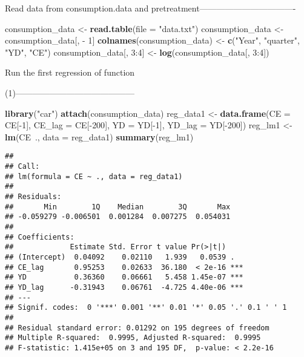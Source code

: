 \documentclass[]{article}
\title{}
\author{}
\date{}
\newenvironment{Shaded}{\begin{snugshade}}{\end{snugshade}}
\newcommand{\KeywordTok}[1]{\textcolor[rgb]{0.13,0.29,0.53}{\textbf{{#1}}}}
\newcommand{\DataTypeTok}[1]{\textcolor[rgb]{0.13,0.29,0.53}{{#1}}}
\newcommand{\DecValTok}[1]{\textcolor[rgb]{0.00,0.00,0.81}{{#1}}}
\newcommand{\StringTok}[1]{\textcolor[rgb]{0.31,0.60,0.02}{{#1}}}
\newcommand{\NormalTok}[1]{{#1}}
\begin{document}
Read data from consumption.data and
pretreatment----------------------------------

\begin{Shaded}
\begin{Highlighting}[]
\NormalTok{consumption_data <-}\StringTok{ }\KeywordTok{read.table}\NormalTok{(}\DataTypeTok{file =} \StringTok{"data.txt"}\NormalTok{)}
\NormalTok{consumption_data <-}\StringTok{ }\NormalTok{consumption_data[, -}\StringTok{ }\DecValTok{1}\NormalTok{]}
\KeywordTok{colnames}\NormalTok{(consumption_data) <-}\StringTok{ }\KeywordTok{c}\NormalTok{(}\StringTok{"Year"}\NormalTok{, }\StringTok{"quarter"}\NormalTok{, }\StringTok{"YD"}\NormalTok{, }\StringTok{"CE"}\NormalTok{)}
\NormalTok{consumption_data[, }\DecValTok{3}\NormalTok{:}\DecValTok{4}\NormalTok{] <-}\StringTok{ }\KeywordTok{log}\NormalTok{(consumption_data[, }\DecValTok{3}\NormalTok{:}\DecValTok{4}\NormalTok{])}
\end{Highlighting}
\end{Shaded}

Run the first regression of function

(1)------------------------------------------

\begin{Shaded}
\begin{Highlighting}[]
\KeywordTok{library}\NormalTok{(}\StringTok{"car"}\NormalTok{)}
\KeywordTok{attach}\NormalTok{(consumption_data)}
\NormalTok{reg_data1 <-}\StringTok{ }\KeywordTok{data.frame}\NormalTok{(}\DataTypeTok{CE =} \NormalTok{CE[-}\DecValTok{1}\NormalTok{], }\DataTypeTok{CE_lag =} \NormalTok{CE[-}\DecValTok{200}\NormalTok{], }\DataTypeTok{YD =} \NormalTok{YD[-}\DecValTok{1}\NormalTok{], }\DataTypeTok{YD_lag =} \NormalTok{YD[-}\DecValTok{200}\NormalTok{])}
\NormalTok{reg_lm1 <-}\StringTok{ }\KeywordTok{lm}\NormalTok{(CE~., }\DataTypeTok{data =} \NormalTok{reg_data1)}
\KeywordTok{summary}\NormalTok{(reg_lm1)}
\end{Highlighting}
\end{Shaded}

\begin{verbatim}
## 
## Call:
## lm(formula = CE ~ ., data = reg_data1)
## 
## Residuals:
##       Min        1Q    Median        3Q       Max 
## -0.059279 -0.006501  0.001284  0.007275  0.054031 
## 
## Coefficients:
##             Estimate Std. Error t value Pr(>|t|)    
## (Intercept)  0.04092    0.02110   1.939   0.0539 .  
## CE_lag       0.95253    0.02633  36.180  < 2e-16 ***
## YD           0.36360    0.06661   5.458 1.45e-07 ***
## YD_lag      -0.31943    0.06761  -4.725 4.40e-06 ***
## ---
## Signif. codes:  0 '***' 0.001 '**' 0.01 '*' 0.05 '.' 0.1 ' ' 1
## 
## Residual standard error: 0.01292 on 195 degrees of freedom
## Multiple R-squared:  0.9995, Adjusted R-squared:  0.9995 
## F-statistic: 1.415e+05 on 3 and 195 DF,  p-value: < 2.2e-16
\end{verbatim}
\end{document}
